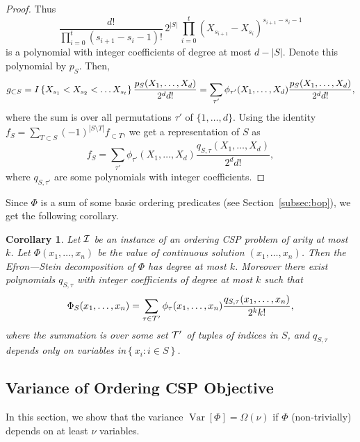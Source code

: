 \documentclass[11pt]{article}
\newif\ifconf
\DeclareMathOperator {\Var}  {Var}
\newcommand {\set}   [1] {\left\{ #1 \right\}}
\newcommand {\Varr}  [1] {\Var \left[#1\right]}
\newcommand {\Tau}    {{\cal{T}}}
\newtheorem{corollary}[theorem]{Corollary}
\begin{document}
\begin{proof}
Thus
$$\frac{d!}{\prod_{i=0}^t (s_{i+1} - s_{i}-1)!}\,2^{|S|}\,\prod_{i=0}^t \left(X_{s_{i+1}} - X_{s_{i}}\right)^{s_{i+1} - s_{i}-1}$$
is a polynomial with integer coefficients of degree at most  $d -|S|$. Denote this polynomial by $p_S$.
Then,
$$
g_{\subset S} = I\set{X_{s_1}<X_{s_2}< \dots X_{s_t}}
\frac{p_{S}(X_1,\dots, X_d)}{2^{d} d!}\\
=
\sum_{\tau'}
\phi_{\tau'}(X_1,\dots, X_d) \frac{p_{S}(X_1,\dots, X_d)}{2^{d} d!},
$$
where the sum is over all permutations $\tau'$ of $\{1,\dots, d\}$.
Using the identity
$
f_S = \sum_{T\subset S} (-1)^{|S\setminus T|} f_{\subset T}$,
we get a representation of $S$ as
$$f_S = \sum_{\tau'}
\phi_{\tau'}(X_1,\dots, X_d) \frac{q_{S,\tau}(X_1,\dots, X_d)}{2^{d} d!},$$
where $q_{S,\tau'}$ are some polynomials with integer coefficients.
\end{proof}
Since $\Phi$ is a sum of some basic ordering predicates (see Section~\ref{subsec:bop}), we get the following corollary.

\begin{corollary}\label{cor:ES-objective}
Let $\cal I$ be an instance of an ordering CSP problem of arity
at most $k$. Let $\Phi(x_1,\dots,x_n)$ be the value of continuous solution $(x_1,\dots,x_n)$.
Then the Efron---Stein decomposition of $\Phi$ has degree at most $k$. Moreover there exist
polynomials $q_{S,\tau}$ with integer coefficients of degree at most $k$ such that
$$\Phi_S(x_1,\dots,x_n) = \sum_{\tau\in \Tau'}
\phi_{\tau}(x_1,\dots,x_n) \frac{q_{S,\tau}(x_1,\dots, x_n)}{2^{k} k!},$$
where the summation is over some set $\Tau'$ of tuples of indices in $S$, and $q_{S,\tau}$ depends only on \ifconf\else variables in\fi $\set{x_i:i \in S}$.
\end{corollary}
\subsection{Variance of Ordering CSP Objective}\label{sec:variance-CSP}
In this section, we show that the variance $\Varr{\Phi} = \Omega(\nu)$ if $\Phi$  (non-trivially) depends on at least $\nu$ variables.
\end{document}
